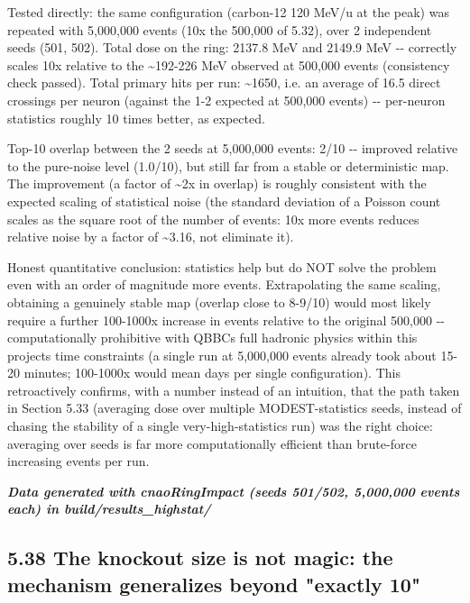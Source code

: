 \documentclass[
  english,
]{article}
\begin{document}
Tested directly: the same configuration (carbon-12 120 MeV/u at the peak) was repeated with 5,000,000 events (10x the 500,000 of 5.32), over 2 independent seeds (501, 502). Total dose on the ring: 2137.8 MeV and 2149.9 MeV -\/- correctly scales 10x relative to the \textasciitilde192-226 MeV observed at 500,000 events (consistency check passed). Total primary hits per run: \textasciitilde1650, i.e. an average of 16.5 direct crossings per neuron (against the 1-2 expected at 500,000 events) -\/- per-neuron statistics roughly 10 times better, as expected.

Top-10 overlap between the 2 seeds at 5,000,000 events: 2/10 -\/- improved relative to the pure-noise level (1.0/10), but still far from a stable or deterministic map. The improvement (a factor of \textasciitilde2x in overlap) is roughly consistent with the expected scaling of statistical noise (the standard deviation of a Poisson count scales as the square root of the number of events: 10x more events reduces relative noise by a factor of \textasciitilde3.16, not eliminate it).

Honest quantitative conclusion: statistics help but do NOT solve the problem even with an order of magnitude more events. Extrapolating the same scaling, obtaining a genuinely stable map (overlap close to 8-9/10) would most likely require a further 100-1000x increase in events relative to the original 500,000 -\/- computationally prohibitive with QBBC\textquotesingle s full hadronic physics within this project\textquotesingle s time constraints (a single run at 5,000,000 events already took about 15-20 minutes; 100-1000x would mean days per single configuration). This retroactively confirms, with a number instead of an intuition, that the path taken in Section 5.33 (averaging dose over multiple MODEST-statistics seeds, instead of chasing the stability of a single very-high-statistics run) was the right choice: averaging over seeds is far more computationally efficient than brute-force increasing events per run.

\emph{\textbf{Data generated with cnaoRingImpact (seeds 501/502, 5,000,000 events each) in build/results\_\allowbreak{}highstat/}}

\subsection{5.38 The knockout size is not magic: the mechanism generalizes beyond "exactly 10"}\label{the-knockout-size-is-not-magic-the-mechanism-generalizes-beyond-exactly-10}
\end{document}
